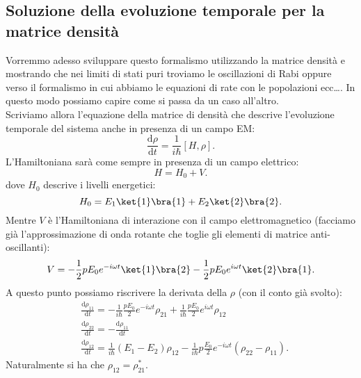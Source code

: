 \subsection{Soluzione della evoluzione temporale per la matrice densità}%
Vorremmo adesso sviluppare questo formalismo utilizzando la matrice densità e mostrando che nei limiti di stati puri troviamo le oscillazioni di Rabi oppure verso il formalismo in cui abbiamo le equazioni di rate con le popolazioni ecc\ldots. In questo modo possiamo capire come si passa da un caso all'altro.\\
Scriviamo allora l'equazione della matrice di densità che descrive l'evoluzione temporale del sistema anche in presenza di un campo EM:
\[
\frac{\text{d} \rho}{\text{d} t} = \frac{1}{i \hbar}\left[H,\rho\right]
.\] 
L'Hamiltoniana sarà come sempre in presenza di un campo elettrico:
\[
H= H_0+V
.\]
dove $H_0$ descrive i livelli energetici:
\[
H_0=E_1\ket{1}\bra{1}+E_2\ket{2}\bra{2}
.\] 
Mentre $V$ è l'Hamiltoniana di interazione con il campo elettromagnetico (facciamo già l'approssimazione di onda rotante che toglie gli elementi di matrice anti-oscillanti):
\[
V=-\frac{1}{2}pE_0e^{-i\omega t}\ket{1}\bra{2}-\frac{1}{2}pE_0e^{i\omega t}\ket{2}\bra{1}
.\] 
A questo punto possiamo riscrivere la derivata della $\rho$ (con il conto già svolto):
\[\begin{aligned}
    &\frac{\text{d} \rho_{11}}{\text{d} t} =
	-\frac{1}{i\hbar }\frac{pE_0}{2}e^{-i\omega t}\rho_{21}
	+\frac{1}{i\hbar }\frac{pE_0}{2}e^{i\omega t}\rho_{12} \\
    &\frac{\text{d} \rho_{22}}{\text{d} t} = 
    -\frac{\text{d} \rho_{11}}{\text{d} t} \\
    &\frac{\text{d} \rho_{12}}{\text{d} t} =
    \frac{1}{i\hbar }\left(E_1-E_2\right)\rho_{12}
    -\frac{1}{i\hbar}p\frac{E_0}{2}e^{-i\omega t}
    \left(\rho_{22}-\rho_{11}\right)
.\end{aligned}\]
Naturalmente si ha che $\rho_{12}=\rho_{21}^*$.
